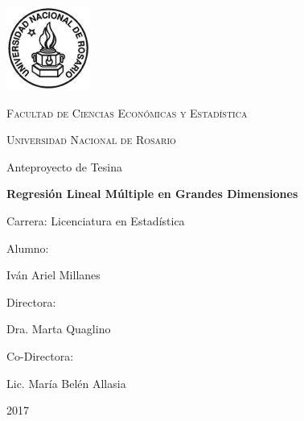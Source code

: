 \documentclass[a4paper,12pt]{article}
\begin{document}
\begin{titlepage}

\begin{center}
\includegraphics{UNR}

{\scshape Facultad de Ciencias Económicas y Estadística}

{\scshape Universidad Nacional de Rosario}
\end{center}

\vspace{2cm}

{\Large{Anteproyecto de Tesina}}

\begin{center}
\Huge{\textbf{Regresión Lineal Múltiple en Grandes Dimensiones}}
\end{center}

\begin{center}
{\large{Carrera: Licenciatura en Estadística}}
\end{center}

\vspace{2.5cm}

{\large

Alumno:

\hspace{0.5cm} Iván Ariel Millanes

\vspace{0.25cm}
Directora:

\hspace{0.5cm} Dra. Marta Quaglino

\vspace{0.25cm}
Co-Directora:

\hspace{0.5cm} Lic. María Belén Allasia

}

\vspace{1cm}
\begin{center}
{\Large{2017}}
\end{center}
\end{titlepage}

\pagestyle{empty}
{
  \renewcommand{\thispagestyle}[1]{}
  \tableofcontents
}
\clearpage
\pagestyle{fancy}

\setcounter{page}{1}
\end{document}
